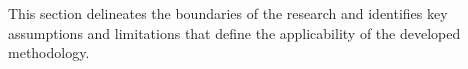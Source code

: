 
This section delineates the boundaries of the research and identifies key assumptions and limitations that define the applicability of the developed methodology.
